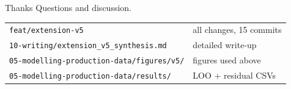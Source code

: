 \documentclass[10pt,aspectratio=169]{beamer}
\begin{document}
\begin{frame}{Thanks}
\centering
\vspace{2em}
\Large Questions and discussion.

\vspace{2em}
\normalsize
\begin{tabular}{ll}
\texttt{feat/extension-v5} & all changes, 15 commits \\
\texttt{10-writing/extension\_v5\_synthesis.md} & detailed write-up \\
\texttt{05-modelling-production-data/figures/v5/} & figures used above \\
\texttt{05-modelling-production-data/results/} & LOO + residual CSVs \\
\end{tabular}
\end{frame}
\end{document}
